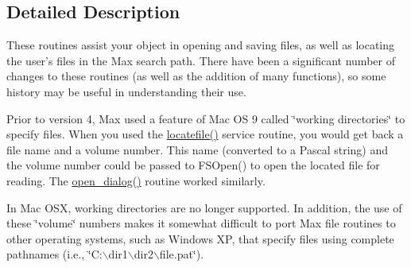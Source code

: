 

\subsection{Detailed Description}
These routines assist your object in opening and saving files, as well as locating the user’s files in the Max search path. There have been a significant number of changes to these routines (as well as the addition of many functions), so some history may be useful in understanding their use.

Prior to version 4, Max used a feature of Mac OS 9 called \char`\"{}working 
	directories\char`\"{} to specify files. When you used the \hyperlink{group__files_ga4d2637351d4a98b83e9a59ef7d500568}{locatefile()} service routine, you would get back a file name and a volume number. This name (converted to a Pascal string) and the volume number could be passed to FSOpen() to open the located file for reading. The \hyperlink{group__files_ga0d8fd0b13e2e623298a45e846af3fe1a}{open\_\-dialog()} routine worked similarly.

In Mac OSX, working directories are no longer supported. In addition, the use of these \char`\"{}volume\char`\"{} numbers makes it somewhat difficult to port Max file routines to other operating systems, such as Windows XP, that specify files using complete pathnames (i.e., \char`\"{}C:$\backslash$dir1$\backslash$dir2$\backslash$file.pat\char`\"{}).

